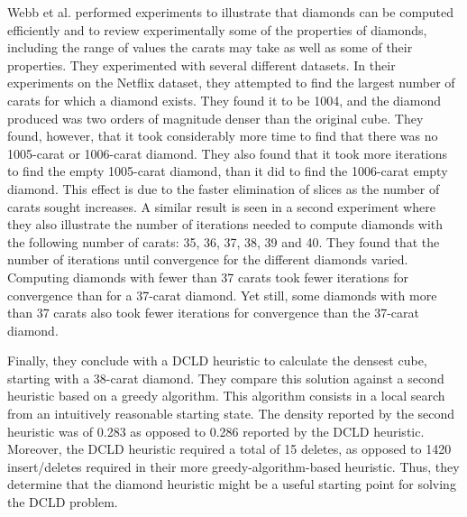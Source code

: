 \documentclass[12pt]{article}
\begin{document}
Webb et al. performed experiments to illustrate that diamonds can be computed efficiently and to review experimentally some of the properties of diamonds,
including the range of values the carats may take as well as some of their properties. They experimented with several different datasets. In their experiments on
the Netflix dataset, they attempted to find the largest number of carats for which a diamond exists. They found it to be 1004, and the diamond produced was two
orders of magnitude denser than the original cube. They found, however, that it took considerably more time to find that there was no 1005-carat or 1006-carat
diamond. They also found that it took more iterations to find the empty 1005-carat diamond, than it did to find the 1006-carat empty diamond. This effect is due
to the faster elimination of slices as the number of carats sought increases. A similar result is seen in a second experiment where they also illustrate the
number of iterations needed to compute diamonds with the following number of carats: 35, 36, 37, 38, 39 and 40. They found that the number of iterations until
convergence for the different diamonds varied. Computing diamonds with fewer than 37 carats took fewer iterations for convergence than for a 37-carat diamond.
Yet still, some diamonds with more than 37 carats also took fewer iterations for convergence than the 37-carat diamond.

Finally, they conclude with a DCLD heuristic to calculate the densest cube, starting with a 38-carat diamond. They compare this solution against a second
heuristic based on a greedy algorithm. This algorithm consists in a local search from an intuitively reasonable starting state. The density reported by the
second heuristic was of 0.283 as opposed to 0.286 reported by the DCLD heuristic. Moreover, the DCLD heuristic required a total of 15 deletes, as opposed to 1420
insert/deletes required in their more greedy-algorithm-based heuristic. Thus, they determine that the diamond heuristic might be a useful starting point for
solving the DCLD problem.




\end{document}
